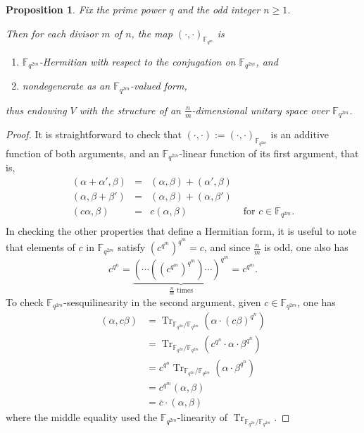 \documentclass[10pt]{amsart}
\theoremstyle{plain}
\newtheorem{proposition}[theorem]{Proposition}
\theoremstyle{definition}
\theoremstyle{remark}
\numberwithin{equation}{section}
\newcommand\Tr{\operatorname{Tr}}
\newcommand\FF{\mathbb{F}}
\begin{document}
\begin{proposition}
Fix the prime power $q$ and the odd integer $n \geq 1$.

Then for each divisor $m$ of $n$, 
the map $(\cdot, \cdot)_{\FF_{q^m}}$ is 
\begin{enumerate}
\item[$\bullet$] $\FF_{q^{2m}}$-Hermitian with
respect to the conjugation on $\FF_{q^{2m}}$, and 
\item[$\bullet$] nondegenerate as an $\FF_{q^{2m}}$-valued form,
\end{enumerate}
thus endowing $V$ with the structure of an 
$\frac{n}{m}$-dimensional unitary space over $\FF_{q^{2m}}$.
\end{proposition}
\begin{proof}
It is straightforward to check that 
$(\cdot, \cdot):=(\cdot, \cdot)_{\FF_{q^{2m}}}$ 
is an additive function of both arguments,
and an $\FF_{q^{2m}}$-linear function of its first argument, that is,
$$
\begin{array}{rlll}
(\alpha+\alpha', \beta)
&=& (\alpha,\beta) +(\alpha', \beta)& \\
(\alpha, \beta+\beta')
&=& (\alpha,\beta) +(\alpha, \beta')& \\
(c \alpha, \beta)
&=&c (\alpha,\beta) &\text{ for }c \in \FF_{q^{2m}}.\\
\end{array}
$$
In checking the other properties that define a Hermitian
form, it is useful to note that
elements of $c$ in $\FF_{q^{2m}}$ satisfy 
$(c^{q^m})^{q^m}=c$, and since $\frac{n}{m}$  is odd, one also has 
$$
c^{q^n} = \underbrace{\left( \cdots 
              \left( \left( c^{q^m}  \right)^{q^m} \right) 
          \cdots \right)^{q^m}}_{\frac{n}{m}\text{ times}} = c^{q^m}.
$$
To check $\FF_{q^{2m}}$-sesquilinearity in the second argument, 
given $c \in \FF_{q^{2m}}$, one has
$$
\begin{array}{rl}
(\alpha, c\beta)
&= \Tr_{\FF_{q^{2n}}/\FF_{q^{2m}}} \left(\alpha \cdot (c\beta)^{q^n} \right) \\
&= \Tr_{\FF_{q^{2n}}/\FF_{q^{2m}}} \left( c^{q^n} \cdot \alpha \cdot \beta^{q^n} \right) \\
&= c^{q^n} \Tr_{\FF_{q^{2n}}/\FF_{q^{2m}}} \left( \alpha \cdot \beta^{q^n} \right) \\
&= c^{q^m} (\alpha, \beta) \\
&= \overline{c} \cdot (\alpha, \beta) 
\end{array}
$$
where the middle equality
used the $\FF_{q^{2m}}$-linearity of $\Tr_{\FF_{q^{2n}}/\FF_{q^{2m}}}$.

\end{proof}
\end{document}
